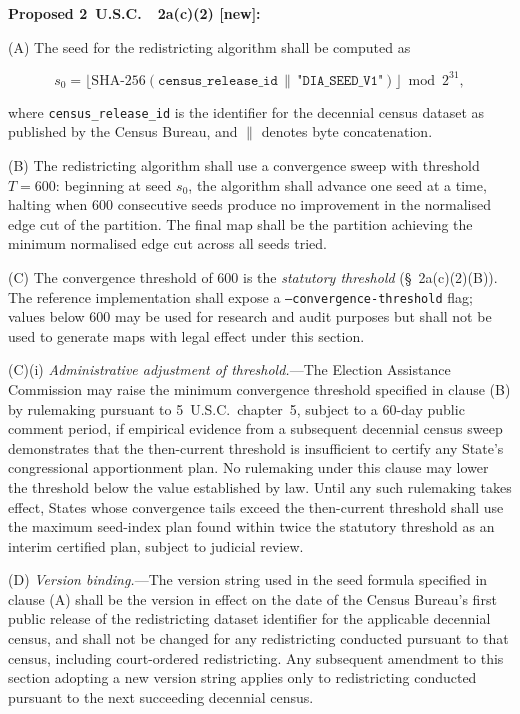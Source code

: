 \begin{statute}
\textbf{Proposed 2~U.S.C.~\textsection~2a(c)(2) [new]:}

\medskip
\noindent
(A) The seed for the redistricting algorithm shall be computed as

\[
  s_0 = \bigl\lfloor
    \mathrm{SHA\text{-}256}(\mathtt{census\_release\_id}
      \,\|\, \texttt{"DIA\_SEED\_V1"})
  \bigr\rfloor \bmod 2^{31},
\]

where \texttt{census\_release\_id} is the identifier for the decennial census
dataset as published by the Census Bureau, and $\|$ denotes byte concatenation.

\medskip
\noindent
(B) The redistricting algorithm shall use a convergence sweep with threshold
$T = 600$: beginning at seed $s_0$, the algorithm shall advance one seed at a
time, halting when 600 consecutive seeds produce no improvement in the
normalised edge cut of the partition.
The final map shall be the partition achieving the minimum normalised edge cut
across all seeds tried.

\medskip
\noindent
(C) The convergence threshold of 600 is the \emph{statutory threshold}
(\S~2a(c)(2)(B)).
The reference implementation shall expose a \texttt{--convergence-threshold}
flag; values below 600 may be used for research and audit purposes but shall
not be used to generate maps with legal effect under this section.

\medskip
\noindent
(C)(i) \emph{Administrative adjustment of threshold.}---The Election Assistance
Commission may raise the minimum convergence threshold specified in clause (B)
by rulemaking pursuant to 5~U.S.C.~chapter~5, subject to a 60-day public
comment period, if empirical evidence from a subsequent decennial census sweep
demonstrates that the then-current threshold is insufficient to certify any
State's congressional apportionment plan.
No rulemaking under this clause may lower the threshold below the value
established by law.
Until any such rulemaking takes effect, States whose convergence tails exceed
the then-current threshold shall use the maximum seed-index plan found within
twice the statutory threshold as an interim certified plan, subject to judicial
review.

\medskip
\noindent
(D) \emph{Version binding.}---The version string used in the seed formula
specified in clause (A) shall be the version in effect on the date of the
Census Bureau's first public release of the redistricting dataset identifier
for the applicable decennial census, and shall not be changed for any
redistricting conducted pursuant to that census, including court-ordered
redistricting.
Any subsequent amendment to this section adopting a new version string applies
only to redistricting conducted pursuant to the next succeeding decennial census.
\end{statute}


